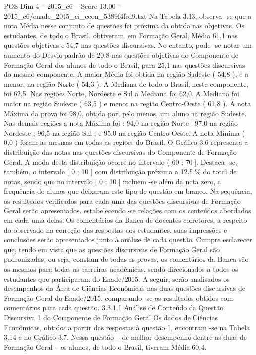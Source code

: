 \begin{textsample}{POS Dim 4 – 2015\_c6 – Score 13.00 – 2015\_c6/enade\_2015\_ci\_econ\_5389f4fcd9.txt}
Na Tabela 3.13, observa -se que a nota Média nesse conjunto de questões foi próxima da obtida nas objetivas.
Os estudantes, de todo o Brasil, obtiveram, em Formação Geral, Média 61,1 nas questões objetivas e 54,7 nas questões discursivas.
No entanto, pode -se notar um aumento do Desvio padrão de 20,8 nas questões objetivas do Componente de Formação Geral dos alunos de todo o Brasil, para 25,1 nas questões discursivas do mesmo componente.
A maior Média foi obtida na região Sudeste ( 54,8 ), e a menor, na região Norte ( 54,3 ).
A Mediana de todo o Brasil, neste componente, foi 62,5.
Nas regiões Norte, Nordeste e Sul a Mediana foi 62,0.
A Mediana foi maior na região Sudeste ( 63,5 ) e menor na região Centro-Oeste ( 61,8 ).
A nota Máxima da prova foi 98,0, obtida por, pelo menos, um aluno na região Sudeste.
Nas demais regiões a nota Máxima foi : 94,0 na região Norte ; 97,0 na região Nordeste ; 96,5 na região Sul ; e 95,0 na região Centro-Oeste.
A nota Mínima ( 0,0 ) foram as mesmas em todas as regiões do Brasil.
O Gráfico 3.6 representa a distribuição das notas nas questões discursivas do Componente de Formação Geral.
A moda desta distribuição ocorre no intervalo ( 60 ; 70 ].
Destaca -se, também, o intervalo [ 0 ; 10 ] com distribuição próxima a 12,5 \% do total de notas, sendo que no intervalo [ 0 ; 10 ] incluem -se além da nota zero, a frequência de alunos que deixaram este tipo de questão em branco.
Na sequência, os resultados verificados para cada uma das questões discursivas de Formação Geral serão apresentados, estabelecendo -se relações com os conteúdos abordados em cada uma delas.
Os comentários da Banca de docentes corretores, a respeito do observado na correção das respostas dos estudantes, suas impressões e conclusões serão apresentados junto à análise de cada questão.
Cumpre esclarecer que, tendo em vista que as questões discursivas de Formação Geral são padronizadas, ou seja, constam de todas as provas, os comentários da Banca são os mesmos para todas as carreiras acadêmicas, sendo direcionados a todos os estudantes que participaram do Enade/2015.
A seguir, serão analisados os desempenhos da Área de Ciências Econômicas nas duas questões discursivas de Formação Geral do Enade/2015, comparando -se os resultados obtidos com comentários para cada questão. 3.3.1.1 Análise de Conteúdo da Questão Discursiva 1 do Componente de Formação Geral Os dados de Ciências Econômicas, obtidos a partir das respostas à questão 1, encontram -se na Tabela 3.14 e no Gráfico 3.7.
Nessa questão – de melhor desempenho dentre as duas de Formação Geral – os alunos, de todo o Brasil, tiveram Média 60,4.

\end{textsample}
